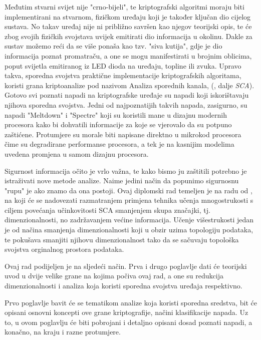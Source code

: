 \documentclass[times, utf8, diplomski]{fer}
\begin{document}
Međutim stvarni svijet nije "crno-bijeli", te kriptografski algoritmi moraju biti implementirani na stvarnom, fizičkom uređaju koji je također ključan dio cijelog sustava. No takav uređaj nije ni približno savršen kao njegov teorijski opis, te će zbog svojih fizičkih svojstava uvijek emitirati dio informacija u okolinu. Dakle za sustav možemo reći da se više ponaša kao tzv. "siva kutija", gdje je dio informacija poznat promatraču, a one se mogu manifestirati u brojnim oblicima, poput svijetla emitiranog iz LED dioda na uređaju, topline ili zvuka. Upravo takva, sporedna svojstva praktične implementacije kriptografskih algoritama, koristi grana kriptoanalize pod nazivom Analiza sporednih kanala, (, dalje \emph{SCA}). Gotovo svi poznati napadi na kriptografske uređaje su napadi koji iskorištavaju njihova sporedna svojstva. Jedni od najpoznatijih takvih napada, zasigurno, su napadi "Meltdown" \citep{Lipp2018meltdown} i "Spectre" \citep{Kocher2018spectre} koji su koristili mane u dizajnu modernih procesora kako bi dohvatili informacije za koje se vjerovalo da su potpuno zaštićene. Protumjere su morale biti napisane direktno u mikrokod procesora čime su degradirane performanse procesora, a tek je na kasnijim modelima uvedena promjena u samom dizajnu procesora.

\medskip
Sigurnost informacija očito je vrlo važna, te kako bismo ju zaštitili potrebno je istraživati nove metode analize. Naime jedini način da popunimo sigurnosnu "rupu" je ako znamo da ona postoji. Ovaj diplomski rad temeljen je na radu od \cite{8836108}, na koji će se nadovezati razmatranjem primjena tehnika učenja mnogostrukosti  s ciljem povećanja učinkovitosti SCA smanjenjem skupa značajki, tj. dimenzionalnosti, no zadržavanjem većine informacija. Učenje višestrukosti jedan je od načina smanjenja dimenzionalnosti koji u obzir uzima topologiju podataka, te pokušava smanjiti njihovu dimenzionalnost tako da se sačuvaju topološka svojstva orginalnog prostora podataka.

\bigskip
Ovaj rad podijeljen je na sljedeći način. Prva i drugo poglavlje dati će teorijski uvod u dvije velike grane na kojima počiva ovaj rad, a one su redukcija dimenzionalnosti i analiza koja koristi sporedna svojstva uređaja respektivno.

Prvo poglavlje bavit će se tematikom analize koja koristi sporedna sredstva, bit će opisani osnovni koncepti ove grane kriptografije, načini klasifikacije napada. Uz to, u ovom poglavlju će biti pobrojani i detaljno opisani dosad poznati napadi, a konačno, na kraju i razne protumjere.
\end{document}
